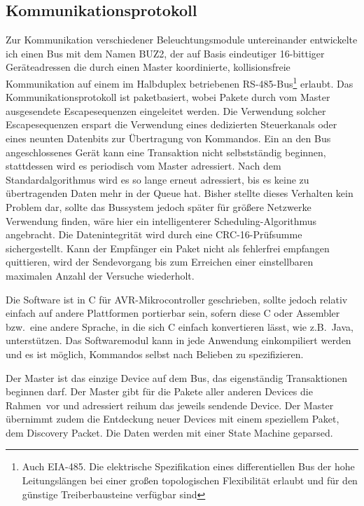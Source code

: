 \documentclass[12pt,a4paper,notitlepage]{article}
\begin{document}
\subsection{Kommunikationsprotokoll}
Zur Kommunikation verschiedener Beleuchtungsmodule untereinander entwickelte ich einen Bus mit dem Namen BUZ2, der auf Basis eindeutiger 16-bittiger Geräteadressen die durch einen Master koordinierte, kollisionsfreie Kommunikation auf einem im \gls{Halbduplex} betriebenen RS-485-Bus\footnote{Auch EIA-485. Die elektrische Spezifikation eines differentiellen Bus der hohe Leitungslängen bei einer großen topologischen Flexibilität erlaubt und für den günstige Treiberbausteine verfügbar sind}\cite{MAXIM76} erlaubt. Das Kommunikationsprotokoll ist paketbasiert, wobei Pakete durch vom Master ausgesendete Escapesequenzen eingeleitet werden. Die Verwendung solcher Escapesequenzen erspart die Verwendung eines dedizierten Steuerkanals oder eines neunten Datenbits zur Übertragung von Kommandos. Ein an den Bus angeschlossenes Gerät kann eine Transaktion nicht selbstständig beginnen, stattdessen wird es periodisch vom Master adressiert. Nach dem Standardalgorithmus wird es so lange erneut adressiert, bis es keine zu übertragenden Daten mehr in der Queue hat. Bisher stellte dieses Verhalten kein Problem dar, sollte das Bussystem jedoch später für größere Netzwerke Verwendung finden, wäre hier ein intelligenterer Scheduling-Algorithmus angebracht. Die Datenintegrität wird durch eine CRC-16-Prüfsumme sichergestellt. Kann der Empfänger ein Paket nicht als fehlerfrei empfangen quittieren, wird der Sendevorgang bis zum Erreichen einer einstellbaren maximalen Anzahl der Versuche wiederholt\cite{LIBC1}.

Die Software ist in C für AVR-Mikrocontroller geschrieben, sollte jedoch relativ einfach auf andere Plattformen portierbar sein, sofern diese C oder Assembler bzw.\ eine andere Sprache, in die sich C einfach konvertieren lässt, wie z.B.\ Java, unterstützen. Das Softwaremodul kann in jede Anwendung einkompiliert werden und es ist möglich, Kommandos selbst nach Belieben zu spezifizieren.

Der Master ist das einzige Device auf dem Bus, das eigenständig Transaktionen beginnen darf. Der Master gibt für die Pakete aller anderen Devices die \glqq Rahmen\grqq\ vor und adressiert reihum das jeweils sendende Device. Der Master übernimmt zudem die Entdeckung neuer Devices mit einem speziellem Paket, dem \glqq Discovery Packet\grqq. Die Daten werden mit einer State Machine geparsed.
\end{document}
